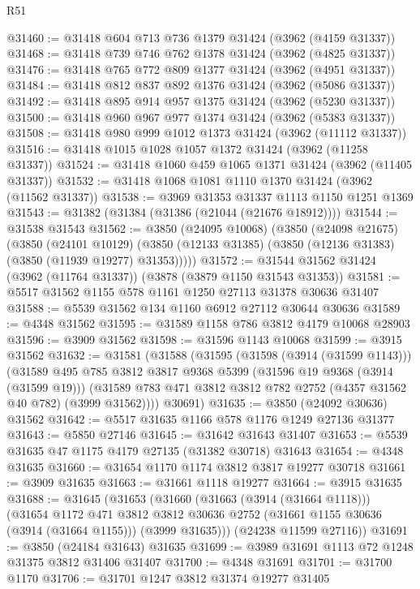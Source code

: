 \begin{lexlean}{R51}
\begin{coremodule}
@31460 := @31418 @604 @713 @736 @1379 @31424 (@3962 (@4159 @31337))
@31468 := @31418 @739 @746 @762 @1378 @31424 (@3962 (@4825 @31337))
@31476 := @31418 @765 @772 @809 @1377 @31424 (@3962 (@4951 @31337))
@31484 := @31418 @812 @837 @892 @1376 @31424 (@3962 (@5086 @31337))
@31492 := @31418 @895 @914 @957 @1375 @31424 (@3962 (@5230 @31337))
@31500 := @31418 @960 @967 @977 @1374 @31424 (@3962 (@5383 @31337))
@31508 := @31418 @980 @999 @1012 @1373 @31424 (@3962 (@11112 @31337))
@31516 := @31418 @1015 @1028 @1057 @1372 @31424 (@3962 (@11258 @31337))
@31524 := @31418 @1060 @459 @1065 @1371 @31424 (@3962 (@11405 @31337))
@31532 := @31418 @1068 @1081 @1110 @1370 @31424 (@3962 (@11562 @31337))
@31538 := @3969 @31353 @31337 @1113 @1150 @1251 @1369
@31543 := @31382 (@31384 (@31386 (@21044 (@21676 @18912))))
@31544 := @31538 @31543
@31562 := @3850
    (@24095 @10068)
    (@3850
      (@24098 @21675)
      (@3850
        (@24101 @10129)
        (@3850 (@12133 @31385) (@3850 (@12136 @31383) (@3850 (@11939 @19277) @31353)))))
@31572 := @31544 @31562 @31424 (@3962 (@11764 @31337)) (@3878 (@3879 @1150 @31543 @31353))
@31581 := @5517 @31562 @1155 @578 @1161 @1250 @27113 @31378 @30636 @31407
@31588 := @5539 @31562 @134 @1160 @6912 @27112 @30644 @30636
@31589 := @4348 @31562
@31595 := @31589 @1158 @786 @3812 @4179 @10068 @28903
@31596 := @3909 @31562
@31598 := @31596 @1143 @10068
@31599 := @3915 @31562
@31632 := @31581
    (@31588
      (@31595
        (@31598 (@3914 (@31599 @1143)))
        (@31589
          @495
          @785
          @3812
          @3817
          @9368
          @5399
          (@31596 @19 @9368 (@3914 (@31599 @19)))
          (@31589 @783 @471 @3812 @3812 @782 @2752 (@4357 @31562 @40 @782) (@3999 @31562))))
      @30691)
@31635 := @3850 (@24092 @30636) @31562
@31642 := @5517 @31635 @1166 @578 @1176 @1249 @27136 @31377
@31643 := @5850 @27146
@31645 := @31642 @31643 @31407
@31653 := @5539 @31635 @47 @1175 @4179 @27135 (@31382 @30718) @31643
@31654 := @4348 @31635
@31660 := @31654 @1170 @1174 @3812 @3817 @19277 @30718
@31661 := @3909 @31635
@31663 := @31661 @1118 @19277
@31664 := @3915 @31635
@31688 := @31645
    (@31653
      (@31660
        (@31663 (@3914 (@31664 @1118)))
        (@31654
          @1172
          @471
          @3812
          @3812
          @30636
          @2752
          (@31661 @1155 @30636 (@3914 (@31664 @1155)))
          (@3999 @31635)))
      (@24238 @11599 @27116))
@31691 := @3850 (@24184 @31643) @31635
@31699 := @3989 @31691 @1113 @72 @1248 @31375 @3812 @31406 @31407
@31700 := @4348 @31691
@31701 := @31700 @1170
@31706 := @31701 @1247 @3812 @31374 @19277 @31405

\end{coremodule}
\end{lexlean}
